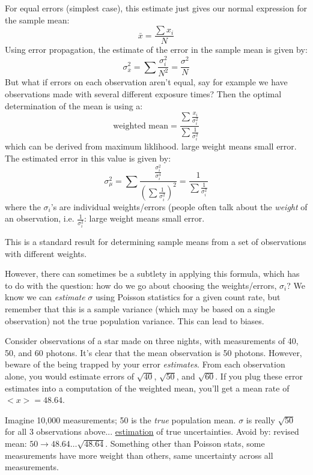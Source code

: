 \documentclass[12pt]{article}
\begin{document}
For equal errors (simplest case),
this estimate just gives our normal expression for
the sample mean:
    $$ \bar{x} = \frac{\sum x_i}{N} $$
Using error propagation, the estimate of the error in the sample mean
is given by:
    $$ \sigma_{\bar{x}}^2 = \sum\frac{\sigma_i^2}{N^2}
       = \frac{\sigma^2}{N}$$
But what if errors on each observation aren't equal, say for example
we have observations made with several different exposure times? Then
the optimal determination of the mean is using a:
    $$ \textrm{weighted\ mean} = \frac{\sum\frac{x_i}{\sigma_i^2}}
       {\sum\frac{1}{\sigma_i^2}} $$
\textcolor{myBlue}{which can be derived from maximum liklihood.
large weight means small error}.
The estimated error in this value is given by:
    $$ \sigma_{\mu}^2 = \sum\frac{\frac{\sigma_i^2}{\sigma_i^4}}
       {(\sum\frac{1}{\sigma_i^2})^2}
       = \frac{1}{\sum\frac{1}{\sigma_i^2}}$$
where the $\sigma_i$'s are individual weights/errors
(people often talk about the \emph{weight} of an observation, i.e.
$\frac{1}{\sigma_i^2}$: large weight means small error.

This is a standard result for determining sample means from a set of
observations with different weights.

However, there can sometimes be a subtlety in applying this formula,
which has to do with the question: how do we go about choosing the
weights/errors, $\sigma_i$? We know we can \emph{estimate} $\sigma$
using Poisson statistics for a given count rate, but remember that
this is a sample variance (which may be based on a single
observation) not the true population variance. This can lead to
biases.

Consider observations of a star made on three nights, with
measurements of 40, 50, and 60 photons. It's clear that the mean
observation is 50 photons. However, beware of the being trapped by
your error \emph{estimates}. From each observation alone, you would estimate
errors of $\sqrt{40}$, $\sqrt{50}$, and $\sqrt{60}$. If you
plug these error estimates into a computation of the weighted mean,
you'll get a mean rate of $<x>=48.64$.

\textcolor{myBlue}{Imagine 10,000 measurements; 50 is the \emph{true}
population mean. $\sigma$ is really $\sqrt{50}$ for all 3 observations
above... \underline{estimation} of true uncertainties.
Avoid by: revised mean: $50 \rightarrow 48.64 \ldots
\sqrt{48.64}$. Something other than Poisson stats, some measurements
have more weight than others, same uncertainty across all
measurements.}
\end{document}
